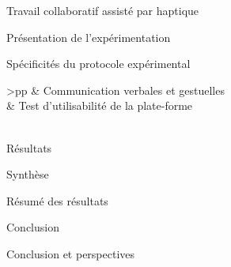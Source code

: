 \documentclass[myfrancais]{mythesis}
\begin{document}
\begin{mychapter}{Travail collaboratif assisté par haptique}
\begin{mysection}{Présentation de l'expérimentation}
\begin{mysubsection}{Spécificités du protocole expérimental}
\begin{mytable}
\begin{mytabular}{>{\bfseries}p{\expfourfirstcolumn}p{\expfoursecondcolumn}}
						                                           &  Communication verbales et gestuelles                           \\
						                                           &  Test d'utilisabilité de la plate-forme                         \\
						\mymiddlerule[\heavyrulewidth]
						 \\
						\mybottomrule
					\end{mytabular}
				\end{mytable}
			\end{mysubsection}
		\end{mysection}
		\begin{mysection}{Résultats}
		\end{mysection}
		\begin{mysection}{Synthèse}
			\begin{mysubsection}{Résumé des résultats}
			\end{mysubsection}
			\begin{mysubsection}{Conclusion}
			\end{mysubsection}
		\end{mysection}
	\end{mychapter}
	\begin{mychapter+}{Conclusion et perspectives}
	\end{mychapter+}
	\myglossary
	\myappendix
\end{document}
